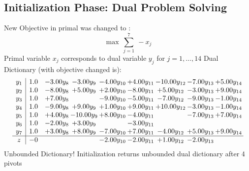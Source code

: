\documentclass[8pt]{article}
\begin{document}
\subsection{Initialization Phase: Dual Problem Solving}
New Objective in primal was changed to : \[ \max\ \sum_{j=1}^{7}\ - x_j \] 
Primal variable $x_j$ corresponds to dual variable $y_j$ for $j = 1,\ldots,14$
Dual Dictionary (with objective changed is): 
\[\begin{array}{c| c c@{\hskip 2pt} c@{\hskip 2pt} c@{\hskip 2pt} c@{\hskip 2pt} c@{\hskip 2pt} c@{\hskip 2pt} c@{\hskip 2pt} }
 y_{1}   &  1.0 & -3.00 y_{8} & -3.00 y_{9} & -4.00 y_{10} & +  4.00 y_{11} & -10.00 y_{12} & -7.00 y_{13} & +  5.00 y_{14}\\
 y_{2}   &  1.0 & -8.00 y_{8} & +  5.00 y_{9} & +  2.00 y_{10} & -8.00 y_{11} & +  5.00 y_{12} & -3.00 y_{13} & +  9.00 y_{14}\\
 y_{3}   &  1.0 & +  7.00 y_{8} &   & -9.00 y_{10} & -5.00 y_{11} & -7.00 y_{12} & -9.00 y_{13} & -1.00 y_{14}\\
 y_{4}   &  1.0 & -9.00 y_{8} & +  9.00 y_{9} & +  1.00 y_{10} & +  9.00 y_{11} & + 10.00 y_{12} & -3.00 y_{13} & -1.00 y_{14}\\
 y_{5}   &  1.0 & +  4.00 y_{8} & -10.00 y_{9} & +  8.00 y_{10} & -4.00 y_{11} &   & -7.00 y_{13} & +  7.00 y_{14}\\
 y_{6}   &  1.0 & -2.00 y_{8} & +  3.00 y_{9} &   & -3.00 y_{11} &    &    &   \\
 y_{7}   &  1.0 & +  3.00 y_{8} & +  8.00 y_{9} & -7.00 y_{10} & +  7.00 y_{11} & -4.00 y_{12} & +  5.00 y_{13} & +  9.00 y_{14}\\
\hline
z    &  -0  &    &   & -2.00 y_{10} & -2.00 y_{11} & +  1.00 y_{12} & -2.00 y_{13} &   \\
\end{array}\]
Unbounded Dictionary!
Initialization returns unbounded dual dictionary after 4 pivots
\end{document}
